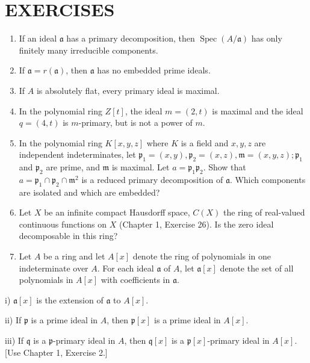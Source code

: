 \documentclass{standalone}
\theoremstyle{definition}
\theoremstyle{remark}
\begin{document}
\section{EXERCISES}
\begin{enumerate}
  \item If an ideal $\mathfrak{a}$ has a primary decomposition, then
  $\operatorname{Spec}(A / \mathfrak{a})$ has only finitely many irreducible
  components.

  \item If $\mathfrak{a}=r(\mathfrak{a})$, then $\mathfrak{a}$ has no embedded
  prime ideals.

  \item If $A$ is absolutely flat, every primary ideal is maximal.

  \item In the polynomial ring $Z[t]$, the ideal $m=(2, t)$ is maximal and the
  ideal $q=(4, t)$ is $m$-primary, but is not a power of $m$.

  \item In the polynomial ring $K[x, y, z]$ where $K$ is a field and $x, y, z$
  are independent indeterminates, let $\mathfrak{p}_{1}=(x, y),
  \mathfrak{p}_{2}=(x, z), \mathfrak{m}=(x, y, z) ; \mathfrak{p}_{1}$ and
  $\mathfrak{p}_{2}$ are prime, and $\mathfrak{m}$ is maximal. Let
  $a=\mathfrak{p}_{1} \mathfrak{p}_{2}$. Show that $a=\mathfrak{p}_{1} \cap
  \mathfrak{p}_{2} \cap \mathfrak{m}^{2}$ is a reduced primary decomposition of
  $\mathfrak{a}$. Which components are isolated and which are embedded?

  \item Let $X$ be an infinite compact Hausdorff space, $C(X)$ the ring of
  real-valued continuous functions on $X$ (Chapter 1, Exercise 26). Is the zero
  ideal decomposable in this ring?

  \item Let $A$ be a ring and let $A[x]$ denote the ring of polynomials in one
  indeterminate over $A$. For each ideal $\mathfrak{a}$ of $A$, let
  $\mathfrak{a}[x]$ denote the set of all polynomials in $A[x]$ with
  coefficients in $\mathfrak{a}$.

\end{enumerate}

i) $\mathfrak{a}[x]$ is the extension of $\mathfrak{a}$ to $A[x]$.

ii) If $\mathfrak{p}$ is a prime ideal in $A$, then $\mathfrak{p}[x]$ is a prime
ideal in $A[x]$.

iii) If $\mathfrak{q}$ is a $\mathfrak{p}$-primary ideal in $A$, then
$\mathfrak{q}[x]$ is a $\mathfrak{p}[x]$-primary ideal in $A[x]$. [Use Chapter
1, Exercise 2.]
\end{document}
